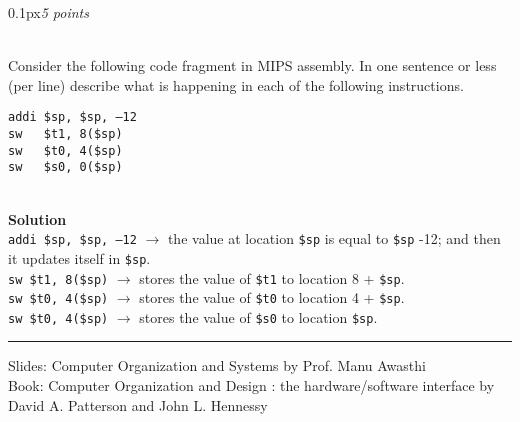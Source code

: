 \documentclass[11pt]{article}
\newcommand{\problem}[2]{\begin{adjustwidth}{0.1px}\noindent \framebox[1.2\width]{\large Problem #1}\hfill \emph{#2} \end{adjustwidth} \bigskip\\}
\newcommand{\code}[1]{{\texttt{#1}}}
\begin{document}
\newpage
\problem{10}{5 points}
Consider the following code fragment in MIPS assembly. In one sentence or less (per line) describe what is happening in each of the following instructions.
\begin{lstlisting}[style=MIPS]
addi $sp, $sp, –12 
sw   $t1, 8($sp) 
sw   $t0, 4($sp) 
sw   $s0, 0($sp)
\end{lstlisting}

\bigskip \\
\textbf{Solution}\\
\code{addi \$sp, \$sp, –12} $\rightarrow$ the value at location \code{\$sp} is equal to \code{\$sp} -12; and then it updates itself in \code{\$sp}.\medskip
\\
\code{sw   \$t1, 8(\$sp)} $\rightarrow$ stores the value of \code{\$t1} to location 8 + \code{\$sp}. \medskip
\\
\code{sw   \$t0, 4(\$sp)} $\rightarrow$ stores the value of \code{\$t0} to location 4 + \code{\$sp}. \medskip
\\
\code{sw   \$t0, 4(\$sp)} $\rightarrow$ stores the value of \code{\$s0} to location \code{\$sp}. \medskip
\\

\par\noindent\rule{\textwidth}{0.4pt}


Slides: Computer Organization and Systems by Prof. Manu Awasthi \\
Book: Computer Organization and Design : the hardware/software interface by David A. Patterson and John L. Hennessy
\end{document}
